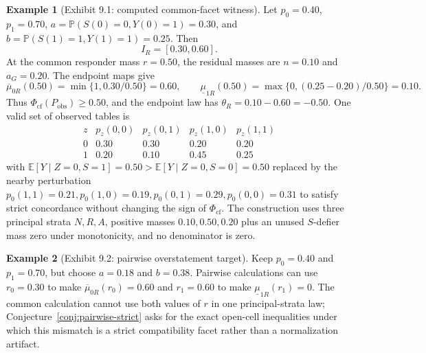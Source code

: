 \documentclass[11pt]{article}
\newcommand{\E}{\mathbb{E}}
\renewcommand{\Pr}{\mathbb{P}}
\theoremstyle{definition}
\newtheorem{example}{Example}
\theoremstyle{plain}
\theoremstyle{remark}
\begin{document}
\begin{example}[Exhibit 9.1: computed common-facet witness]\label{ex:computed-witness}
Let \(p_0=0.40\), \(p_1=0.70\), \(a=\Pr(S(0)=0,Y(0)=1)=0.30\), and \(b=\Pr(S(1)=1,Y(1)=1)=0.25\). Then
\[
  I_R=[0.30,0.60].
\]
At the common responder mass \(r=0.50\), the residual masses are \(n=0.10\) and \(a_G=0.20\). The endpoint maps give
\[
  \overline\mu_{0R}(0.50)=\min\{1,0.30/0.50\}=0.60,
  \qquad
  \underline\mu_{1R}(0.50)=\max\{0,(0.25-0.20)/0.50\}=0.10.
\]
Thus \(\Phi_{\mathrm{cf}}(P_{\mathrm{obs}})\ge0.50\), and the endpoint law has \(\theta_R=0.10-0.60=-0.50\). One valid set of observed tables is
\[
\begin{array}{c|cccc}
z & p_z(0,0)&p_z(0,1)&p_z(1,0)&p_z(1,1)\\
\hline
0&0.30&0.30&0.20&0.20\\
1&0.20&0.10&0.45&0.25
\end{array}
\]
with \(\E[Y\mid Z=0,S=1]=0.50>\E[Y\mid Z=0,S=0]=0.50\) replaced by the nearby perturbation \(p_0(1,1)=0.21,p_0(1,0)=0.19,p_0(0,1)=0.29,p_0(0,0)=0.31\) to satisfy strict concordance without changing the sign of \(\Phi_{\mathrm{cf}}\). The construction uses three principal strata \(N,R,A\), positive masses \(0.10,0.50,0.20\) plus an unused \(S\)-defier mass zero under monotonicity, and no denominator is zero.
\end{example}

\begin{example}[Exhibit 9.2: pairwise overstatement target]\label{ex:pairwise}
Keep \(p_0=0.40\) and \(p_1=0.70\), but choose \(a=0.18\) and \(b=0.38\). Pairwise calculations can use \(r_0=0.30\) to make \(\overline\mu_{0R}(r_0)=0.60\) and \(r_1=0.60\) to make \(\underline\mu_{1R}(r_1)=0\). The common calculation cannot use both values of \(r\) in one principal-strata law; Conjecture~\ref{conj:pairwise-strict} asks for the exact open-cell inequalities under which this mismatch is a strict compatibility facet rather than a normalization artifact.
\end{example}
\end{document}

